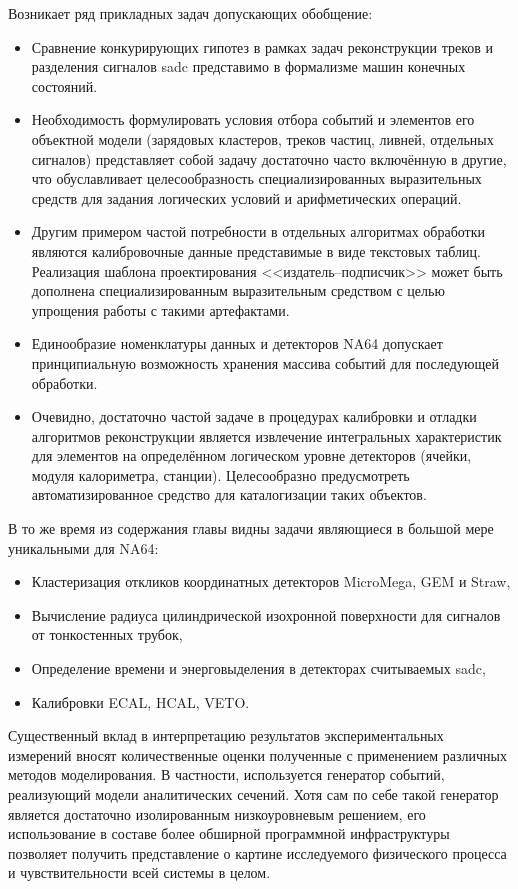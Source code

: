 Возникает ряд прикладных задач допускающих обобщение:
\begin{itemize}
    \item Сравнение конкурирующих гипотез в рамках задач
    реконструкции треков и разделения
    сигналов \acrshort{sadc} представимо в формализме
    машин конечных состояний.
    \item Необходимость формулировать условия отбора событий
    и элементов его объектной модели (зарядовых кластеров,
    треков частиц, ливней, отдельных сигналов) представляет
    собой задачу достаточно часто включённую в другие, что
    обуславливает целесообразность специализированных выразительных
    средств для задания логических условий и арифметических операций.
    \item Другим примером частой потребности в отдельных
    алгоритмах обработки являются калибровочные данные
    представимые в виде текстовых таблиц.
    Реализация шаблона проектирования <<издатель--подписчик>>
    может быть дополнена специализированным выразительным
    средством с целью упрощения работы с такими артефактами.
    \item Единообразие номенклатуры данных и детекторов
    NA64 допускает принципиальную возможность хранения
    массива событий для последующей обработки.
    \item Очевидно, достаточно частой задаче в процедурах
    калибровки и отладки алгоритмов реконструкции
    является извлечение интегральных характеристик для элементов на
    определённом логическом уровне детекторов
    (ячейки, модуля калориметра, станции). Целесообразно предусмотреть
    автоматизированное средство для каталогизации таких объектов.
\end{itemize}

В то же время из содержания главы видны задачи являющиеся
в большой мере уникальными для NA64:
\begin{itemize}
    \item Кластеризация откликов координатных детекторов
    MicroMega, GEM и Straw,
    \item Вычисление радиуса цилиндрической изохронной поверхности
    для сигналов от тонкостенных трубок,
    \item Определение времени и энерговыделения в детекторах
    считываемых \acrshort{sadc},
    \item Калибровки ECAL, HCAL, VETO.
\end{itemize}

Существенный вклад в интерпретацию результатов экспериментальных
измерений вносят количественные оценки полученные с применением различных
методов моделирования. В частности, используется генератор
событий, реализующий модели аналитических сечений. Хотя сам по себе
такой генератор является достаточно изолированным низкоуровневым решением, его
использование в составе более обширной программной инфраструктуры
позволяет получить представление о картине исследуемого физического
процесса и чувствительности всей системы в целом.

